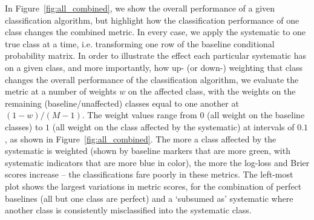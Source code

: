 

In Figure~\ref{fig:all_combined}, we show the overall performance of a given classification algorithm, but highlight how the classification performance of one class changes the combined metric. In every case, we apply the systematic to one true class at a time, i.e. transforming one row of the baseline conditional probability matrix. 
In order to illustrate the effect each particular systematic has on a given class, and more importantly, how up- (or down-) weighting that class changes the overall performance of the classification algorithm, we evaluate the metric at a number of weights $w$ on the affected class, with the weights on the remaining (baseline/unaffected) classes equal to one another at $(1 - w) / (M - 1)$.
The weight values range from $0$ (all weight on the baseline classes) to $1$ (all weight on the class affected by the systematic) at intervals of $0.1$, as shown in Figure~\ref{fig:all_combined}. The more a class affected by the systematic is weighted (shown by baseline markers that are more green, with systematic indicators that are more blue in color), the more the log-loss and Brier scores increase -- the classifications fare poorly in these metrics. The left-most plot shows the largest variations in metric scores, for the combination of perfect baselines (all but one class are perfect) and a `subsumed as' systematic where another class is consistently misclassified into the systematic class. 

